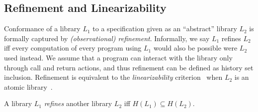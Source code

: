 \subsection{Refinement and Linearizability}
\vspace{-1.5mm}
Conformance of a library $L_1$ to a specification given as an ``abstract'' library $L_2$ 
is formally captured by \emph{(observational) refinement}. Informally, 
we
say $L_1$ refines $L_2$ if{f} every computation of every program
using $L_1$ would also be possible were $L_2$ used instead. We assume that a program can 
interact with the library only through call and return actions, and thus refinement can be defined
as history set inclusion. Refinement is equivalent to the \emph{linearizability} criterion~\cite{journals/toplas/HerlihyW90} 
when $L_2$ is an atomic library~\cite{journals/tcs/FilipovicORY10,DBLP:conf/popl/BouajjaniEEH15}.
 
\vspace{-1.5mm}
\begin{definition}
A library $L_1$ \emph{refines} another library $L_2$ if{f} $H(L_1) \subseteq H(L_2)$.
\vspace{-1.5mm}
\end{definition}


